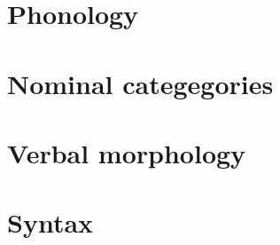 \documentclass[output=book,
  nonflat,
  modfonts,
  smallfont,
    arseneau
		  ]{langsci/langscibook}
\begin{document}
     

 

\maketitle
\frontmatter

\tableofcontents



\mainmatter
% 
% 

% 
\part{Phonology}


\part{Nominal categegories}










\part{Verbal morphology}









\part{Syntax}












\end{document}
